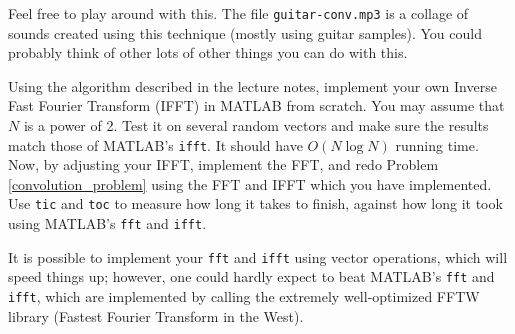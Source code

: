Feel free to play around with this. The file \texttt{guitar-conv.mp3} is a collage of sounds created using this technique (mostly using guitar samples). You could probably think of other lots of other things you can do with this.



\begin{problem}
Using the algorithm described in the lecture notes, implement your own Inverse Fast Fourier Transform (IFFT) in MATLAB from scratch. You may assume that $N$ is a power of 2. Test it on several random vectors and make sure the results match those of MATLAB's \texttt{ifft}. It should have $O(N\log N)$ running time. Now, by adjusting your IFFT, implement the FFT, and redo Problem \ref{convolution_problem} using the FFT and IFFT which you have implemented. Use \texttt{tic} and \texttt{toc} to measure how long it takes to finish, against how long it took using MATLAB's \texttt{fft} and \texttt{ifft}.
\end{problem}

It is possible to implement your \texttt{fft} and \texttt{ifft} using vector operations, which will speed things up; however, one could hardly expect to beat MATLAB's \texttt{fft} and \texttt{ifft}, which are implemented by calling the extremely well-optimized FFTW library (Fastest Fourier Transform in the West).



